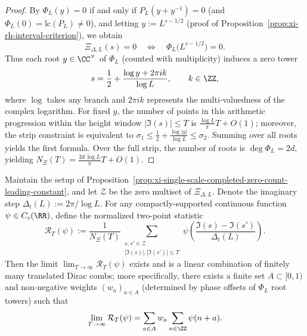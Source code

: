 \begin{proof}
By \(\Phi_L(y)=0\) if and only if \(P_L(y+y^{-1})=0\) (and \(\Phi_L(0)=\mathrm{lc}(P_L)\neq 0\)), and letting \(y:=L^{s-1/2}\) (proof of Proposition~\ref{prop:xi-rh-interval-criterion}), we obtain
\[
\Xi_{\Delta,L}(s)=0\quad\Longleftrightarrow\quad \Phi_L\!\bigl(L^{s-1/2}\bigr)=0.
\]
Thus each root \(y\in\CC^\times\) of \(\Phi_L\) (counted with multiplicity) induces a zero tower
\[
s=\frac12+\frac{\log y+2\pi i k}{\log L},\qquad k\in\ZZ,
\]
where \(\log\) takes any branch and \(2\pi i k\) represents the multi-valuedness of the complex logarithm.
For fixed \(y\), the number of points in this arithmetic progression within the height window \(|\Im(s)|\le T\) is \(\frac{\log L}{\pi}T+O(1)\);
moreover, the strip constraint is equivalent to
\(
\sigma_1\le \frac12+\frac{\log|y|}{\log L}\le \sigma_2
\).
Summing over all roots yields the first formula.
Over the full strip, the number of roots is \(\deg\Phi_L=2d\), yielding
\(
N_{\Xi}(T)=\frac{2d\,\log L}{\pi}T+O(1)
\).
\end{proof}

\begin{proposition}\label{prop:xi-single-scale-two-point-correlation-comb}
Maintain the setup of Proposition~\ref{prop:xi-single-scale-completed-zero-count-leading-constant}, and let \(\mathcal Z\) be the zero multiset of \(\Xi_{\Delta,L}\).
Denote the imaginary step
\(
\Delta_t(L):=2\pi/\log L
\).
For any compactly-supported continuous function \(\psi\in C_c(\RR)\), define the normalized two-point statistic
\[
\mathcal R_T(\psi)
:=\frac{1}{N_{\Xi}(T)}
\sum_{\substack{s,s'\in\mathcal Z\\ |\Im(s)|,|\Im(s')|\le T}}
\psi\!\left(\frac{\Im(s)-\Im(s')}{\Delta_t(L)}\right).
\]
Then the limit \(\lim_{T\to\infty}\mathcal R_T(\psi)\) exists and is a linear combination of finitely many translated Dirac combs;
more specifically, there exists a finite set \(A\subset[0,1)\) and non-negative weights \((w_a)_{a\in A}\) (determined by phase offsets of \(\Phi_L\) root towers) such that
\[
\lim_{T\to\infty}\mathcal R_T(\psi)
=\sum_{a\in A} w_a\sum_{n\in\ZZ}\psi(n+a).
\]
\end{proposition}

